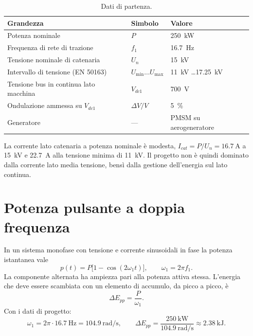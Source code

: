 \documentclass[11pt,a4paper]{article}
\begin{document}
\begin{table}[h]
\centering
\begin{tabular}{lll}
\toprule
Grandezza & Simbolo & Valore \\
\midrule
Potenza nominale & $P$ & \SI{250}{\kilo\watt} \\
Frequenza di rete di trazione & $f_1$ & \SI{16.7}{\hertz} \\
Tensione nominale di catenaria & $U_n$ & \SI{15}{\kilo\volt} \\
Intervallo di tensione (EN 50163) & $U_{\min}\dots U_{\max}$ & \SI{11}{\kilo\volt} \dots \SI{17.25}{\kilo\volt} \\
Tensione bus in continua lato macchina & $V_{dc1}$ & \SI{700}{\volt} \\
Ondulazione ammessa su $V_{dc1}$ & $\Delta V/V$ & \SI{5}{\percent} \\
Generatore & --- & PMSM su aerogeneratore \\
\bottomrule
\end{tabular}
\caption{Dati di partenza.}
\end{table}

La corrente lato catenaria a potenza nominale è modesta,
$I_{cat}=P/U_n=\SI{16.7}{\ampere}$ a \SI{15}{\kilo\volt} e \SI{22.7}{\ampere} alla
tensione minima di \SI{11}{\kilo\volt}. Il progetto non è quindi dominato dalla corrente
lato media tensione, bensì dalla gestione dell'energia sul lato continua.

\section{Potenza pulsante a doppia frequenza}

In un sistema monofase con tensione e corrente sinusoidali in fase la potenza istantanea
vale
\begin{equation}
p(t) = P\bigl[1-\cos(2\omega_1 t)\bigr], \qquad \omega_1 = 2\pi f_1 .
\end{equation}
La componente alternata ha ampiezza pari alla potenza attiva stessa. L'energia che deve
essere scambiata con un elemento di accumulo, da picco a picco, è
\begin{equation}
\Delta E_{pp} = \frac{P}{\omega_1}.
\label{eq:energia}
\end{equation}
Con i dati di progetto:
\begin{equation}
\omega_1 = 2\pi\cdot\SI{16.7}{\hertz} = \SI{104.9}{\radian\per\second},
\qquad
\Delta E_{pp} = \frac{\SI{250}{\kilo\watt}}{\SI{104.9}{\radian\per\second}}
\approx \SI{2.38}{\kilo\joule}.
\end{equation}
\end{document}
